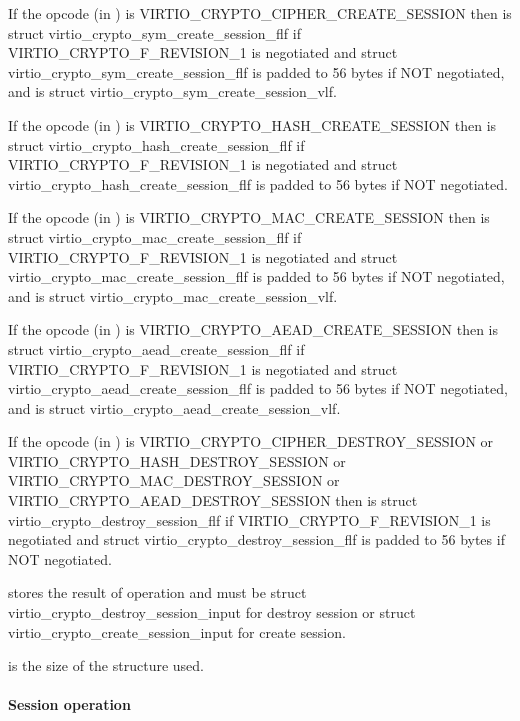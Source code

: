 \begin{itemize*}
\item If the opcode (in ) is VIRTIO_CRYPTO_CIPHER_CREATE_SESSION
    then  is struct virtio_crypto_sym_create_session_flf if
    VIRTIO_CRYPTO_F_REVISION_1 is negotiated and struct virtio_crypto_sym_create_session_flf is
    padded to 56 bytes if NOT negotiated, and  is struct
    virtio_crypto_sym_create_session_vlf.
\item If the opcode (in ) is VIRTIO_CRYPTO_HASH_CREATE_SESSION
    then  is struct virtio_crypto_hash_create_session_flf if
    VIRTIO_CRYPTO_F_REVISION_1 is negotiated and struct virtio_crypto_hash_create_session_flf is
    padded to 56 bytes if NOT negotiated.
\item If the opcode (in ) is VIRTIO_CRYPTO_MAC_CREATE_SESSION
    then  is struct virtio_crypto_mac_create_session_flf if
    VIRTIO_CRYPTO_F_REVISION_1 is negotiated and struct virtio_crypto_mac_create_session_flf is
    padded to 56 bytes if NOT negotiated, and  is struct
    virtio_crypto_mac_create_session_vlf.
\item If the opcode (in ) is VIRTIO_CRYPTO_AEAD_CREATE_SESSION
    then  is struct virtio_crypto_aead_create_session_flf if
    VIRTIO_CRYPTO_F_REVISION_1 is negotiated and struct virtio_crypto_aead_create_session_flf is
    padded to 56 bytes if NOT negotiated, and  is struct
    virtio_crypto_aead_create_session_vlf.
\item If the opcode (in ) is VIRTIO_CRYPTO_CIPHER_DESTROY_SESSION
    or VIRTIO_CRYPTO_HASH_DESTROY_SESSION or VIRTIO_CRYPTO_MAC_DESTROY_SESSION or
    VIRTIO_CRYPTO_AEAD_DESTROY_SESSION then  is struct
    virtio_crypto_destroy_session_flf if VIRTIO_CRYPTO_F_REVISION_1 is negotiated and
    struct virtio_crypto_destroy_session_flf is padded to 56 bytes if NOT negotiated.
\end{itemize*}

 stores the result of operation and must be struct
virtio_crypto_destroy_session_input for destroy session or
struct virtio_crypto_create_session_input for create session.

 is the size of the structure used.


\paragraph{Session operation}\label{sec:Device Types / Crypto Device / Device
Operation / Control Virtqueue / Session operation}

